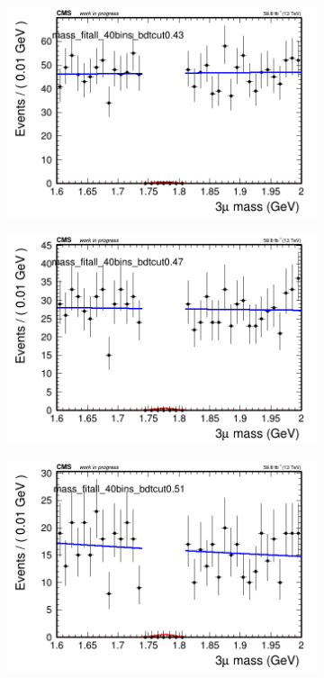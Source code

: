 \begin{figure}[H]
\begin{subfigure}{0.2\textwidth}
        \caption{}
    \end{subfigure}
    \begin{subfigure}{0.2\textwidth}
        \includegraphics[width=\textwidth]{power_law/plots/all/massfit_all_40bins_bdtcut0.43.png}
        \caption{}
    \end{subfigure}
    \begin{subfigure}{0.2\textwidth}
        \includegraphics[width=\textwidth]{power_law/plots/all/massfit_all_40bins_bdtcut0.47.png}
        \caption{}
    \end{subfigure}
    \begin{subfigure}{0.2\textwidth}
        \includegraphics[width=\textwidth]{power_law/plots/all/massfit_all_40bins_bdtcut0.51.png}

\end{subfigure}
\end{figure}
